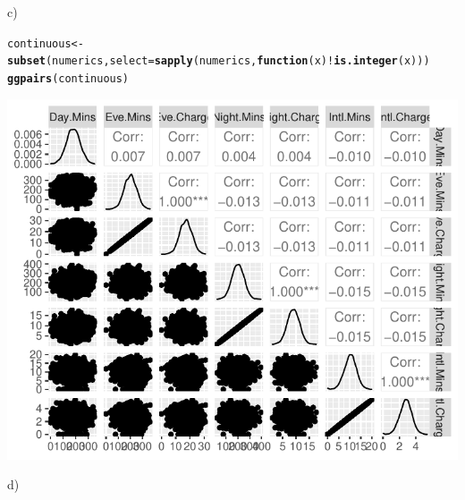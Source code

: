 \documentclass{article}\usepackage[]{graphicx}\usepackage[]{color}
\makeatletter
\def\maxwidth{ %
  \ifdim\Gin@nat@width>\linewidth
    \linewidth
  \else
    \Gin@nat@width
  \fi
}
\newcommand{\hlopt}[1]{\textcolor[rgb]{0,0,0}{#1}}%
\newcommand{\hlstd}[1]{\textcolor[rgb]{0.345,0.345,0.345}{#1}}%
\newcommand{\hlkwa}[1]{\textcolor[rgb]{0.161,0.373,0.58}{\textbf{#1}}}%
\newcommand{\hlkwb}[1]{\textcolor[rgb]{0.69,0.353,0.396}{#1}}%
\newcommand{\hlkwc}[1]{\textcolor[rgb]{0.333,0.667,0.333}{#1}}%
\newcommand{\hlkwd}[1]{\textcolor[rgb]{0.737,0.353,0.396}{\textbf{#1}}}%
\newenvironment{kframe}{%
 \def\at@end@of@kframe{}%
 \ifinner\ifhmode%
  \def\at@end@of@kframe{\end{minipage}}%
  \begin{minipage}{\columnwidth}%
 \fi\fi%
 \def\FrameCommand##1{\hskip\@totalleftmargin \hskip-\fboxsep
 \colorbox{shadecolor}{##1}\hskip-\fboxsep
     \hskip-\linewidth \hskip-\@totalleftmargin \hskip\columnwidth}%
 \MakeFramed {\advance\hsize-\width
   \@totalleftmargin\z@ \linewidth\hsize
   \@setminipage}}%
 {\par\unskip\endMakeFramed%
 \at@end@of@kframe}
\newenvironment{knitrout}{}{} %
\makeatother
\begin{document}
\begin{description}
\begin{knitrout}
{}



\end{knitrout}

\item{c)}

\begin{knitrout}
\color{fgcolor}\begin{kframe}
\begin{alltt}
\hlstd{continuous} \hlkwb{<-} \hlkwd{subset}\hlstd{(numerics,} \hlkwc{select}\hlstd{=}\hlkwd{sapply}\hlstd{(numerics,} \hlkwa{function}\hlstd{(}\hlkwc{x}\hlstd{)} \hlopt{!}\hlkwd{is.integer}\hlstd{(x)))}
\hlkwd{ggpairs}\hlstd{(continuous)}
\end{alltt}
\end{kframe}

{\centering \includegraphics[width=\maxwidth]{figure/Pair_plot_for_continuous_variables-1} 

}



\end{knitrout}

\item{d)}


\end{description}
\end{document}
